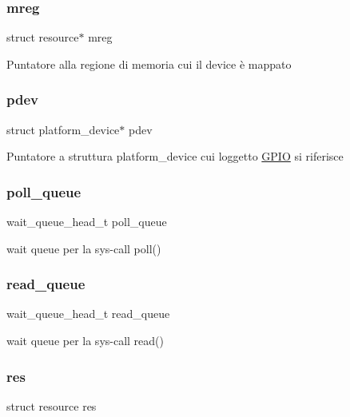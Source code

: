 \subsubsection{\texorpdfstring{mreg}{mreg}}
{\footnotesize\ttfamily struct resource$\ast$ mreg}

Puntatore alla regione di memoria cui il device è mappato \mbox{\label{structGPIO_a6fb27e0c8e2d8544acca44725266b5d3}} 
\subsubsection{\texorpdfstring{pdev}{pdev}}
{\footnotesize\ttfamily struct platform\+\_\+device$\ast$ pdev}

Puntatore a struttura platform\+\_\+device cui l\textquotesingle{}oggetto \hyperlink{structGPIO}{G\+P\+IO} si riferisce \mbox{\label{structGPIO_a2080617f88cafd765430573afe7701d1}} 
\subsubsection{\texorpdfstring{poll\+\_\+queue}{poll\_queue}}
{\footnotesize\ttfamily wait\+\_\+queue\+\_\+head\+\_\+t poll\+\_\+queue}

wait queue per la sys-\/call poll() \mbox{\label{structGPIO_a251570f8e6976ad87411093e330e7b4f}} 
\subsubsection{\texorpdfstring{read\+\_\+queue}{read\_queue}}
{\footnotesize\ttfamily wait\+\_\+queue\+\_\+head\+\_\+t read\+\_\+queue}

wait queue per la sys-\/call read() \mbox{\label{structGPIO_a4a49895b3f09db037a0b8df5c9b8d874}} 
\subsubsection{\texorpdfstring{res}{res}}
{\footnotesize\ttfamily struct resource res}

